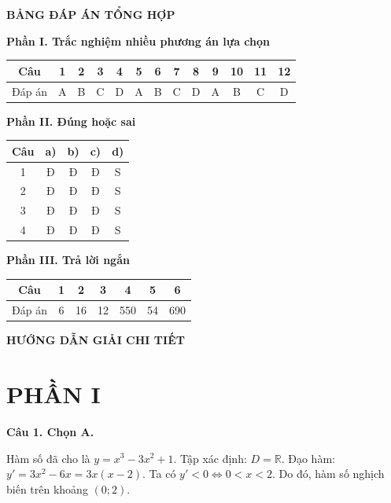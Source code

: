 \documentclass[12pt,a4paper]{article}
\newcommand{\loigiai}[1]{\par\medskip\Needspace{4\baselineskip}\noindent\textbf{#1}\par\nobreak}
\begin{document}
\newpage\pagestyle{answers}
\begin{center}\Large\textbf{BẢNG ĐÁP ÁN TỔNG HỢP}\end{center}
\textbf{Phần I. Trắc nghiệm nhiều phương án lựa chọn}
\begin{center}
\renewcommand{\arraystretch}{1.5}
\begin{tabular}{|c|*{12}{c|}}\hline
Câu & 1&2&3&4&5&6&7&8&9&10&11&12\\\hline
Đáp án & A & B & C & D & A & B & C & D & A & B & C & D \\\hline
\end{tabular}
\end{center}

\textbf{Phần II. Đúng hoặc sai}
\begin{center}
\renewcommand{\arraystretch}{1.4}
\begin{tabular}{|c|c|c|c|c|}\hline
Câu & a) & b) & c) & d)\\\hline
1 & Đ & Đ & Đ & S\\\hline
2 & Đ & Đ & Đ & S\\\hline
3 & Đ & Đ & Đ & S\\\hline
4 & Đ & Đ & Đ & S\\\hline
\end{tabular}
\end{center}

\textbf{Phần III. Trả lời ngắn}
\begin{center}
\renewcommand{\arraystretch}{1.5}
\begin{tabular}{|c|c|c|c|c|c|c|}\hline
Câu & 1 & 2 & 3 & 4 & 5 & 6\\\hline
Đáp án & 6 & 16 & 12 & 550 & 54 & 690 \\\hline
\end{tabular}
\end{center}

\vspace{0.5cm}
\begin{center}
\large\textbf{HƯỚNG DẪN GIẢI CHI TIẾT}
\end{center}

\section*{PHẦN I}

\loigiai{Câu 1. Chọn A.}
Hàm số đã cho là $y=x^3-3x^2+1$.
Tập xác định: $D=\mathbb{R}$.
Đạo hàm: $y'=3x^2-6x=3x(x-2)$.
Ta có $y'<0 \iff 0 < x < 2$.
Do đó, hàm số nghịch biến trên khoảng $(0;2)$.
\end{document}
